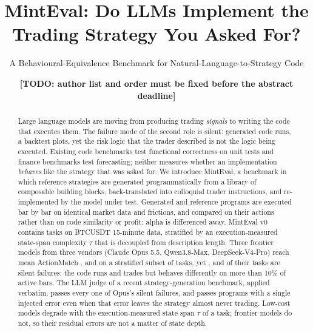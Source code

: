 \documentclass[sigconf,anonymous,review]{acmart}
\newcommand{\todo}[1]{{\color{red}\textbf{[TODO: #1]}}}
\begin{document}
\title{MintEval: Do LLMs Implement the Trading Strategy You Asked For?}
\subtitle{A Behavioural-Equivalence Benchmark for Natural-Language-to-Strategy Code}

\author{\todo{author list and order must be fixed before the abstract deadline}}
\affiliation{\institution{\todo{affiliation}}\country{}}

\begin{abstract}
Large language models are moving from producing trading \emph{signals} to writing the code that
executes them. The failure mode of the second role is silent: generated code runs, a backtest
plots, yet the risk logic that the trader described is not the logic being executed. Existing
code benchmarks test functional correctness on unit tests and finance benchmarks test forecasting;
neither measures whether an implementation \emph{behaves} like the strategy that was asked for.
We introduce MintEval, a benchmark in which reference strategies are generated programmatically
from a library of composable building blocks, back-translated into colloquial trader instructions,
and re-implemented by the model under test. Generated and reference programs are executed bar by
bar on identical market data and frictions, and compared on their actions rather than on code
similarity or profit: alpha is differenced away. MintEval v0 contains \NTasks{} tasks on BTCUSDT
15-minute data, stratified by an execution-measured state-span complexity $\tau$ that is decoupled
from description length. Three frontier models from three vendors (Claude Opus 5.5, Qwen3.8-Max, DeepSeek-V4-Pro) reach
mean ActionMatch \AMSubOpus, \AMSubQMax{} and \AMSubDSPro{} on a stratified subset of \NSub{} tasks, yet
\SilentSubOpus, \SilentSubQMax{} and \SilentSubDSPro{} of their tasks are silent failures: the code runs
and trades but behaves differently on more than 10\% of active bars. The LLM judge of a recent
strategy-generation benchmark, applied verbatim, passes every one of Opus's silent failures, and passes
programs with a single injected error even when that error leaves the strategy almost never trading.
Low-cost models degrade with the execution-measured state span $\tau$ of a task; frontier models do
not, so their residual errors are not a matter of state depth.
\end{abstract}
\end{document}
